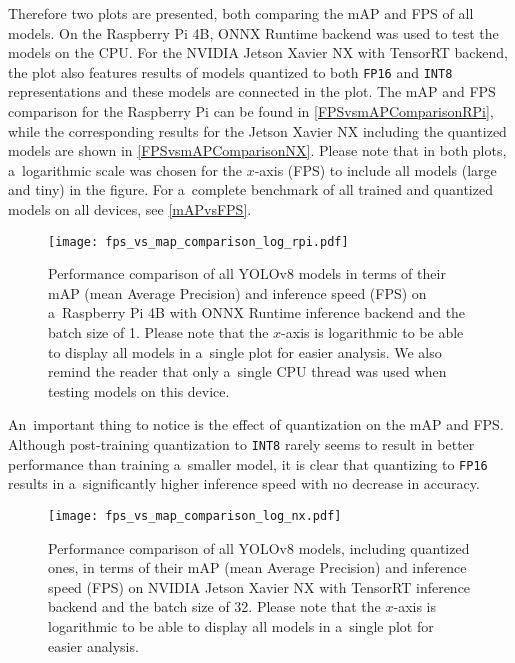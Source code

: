 Therefore two plots are presented, both comparing the mAP and FPS of all models.
On the Raspberry Pi 4B, ONNX Runtime backend was used to test the models on the
CPU. For the NVIDIA Jetson Xavier NX with TensorRT backend, the plot also
features results of models quantized to both \texttt{FP16} and \texttt{INT8}
representations and these models are connected in the plot. The mAP and FPS
comparison for the Raspberry Pi can be found in \autoref{FPSvsmAPComparisonRPi},
while the corresponding results for the Jetson Xavier NX including the quantized
models are shown in \autoref{FPSvsmAPComparisonNX}. Please note that in both
plots, a~logarithmic scale was chosen for the $x$-axis (FPS) to include all
models (large and tiny) in the figure. For a~complete benchmark of all trained
and quantized models on all devices, see \autoref{mAPvsFPS}.

\begin{figure}[t]
        \centering
        \texttt{[image: fps\_vs\_map\_comparison\_log\_rpi.pdf]}
        \caption{Performance comparison of all YOLOv8 models in terms of their
        mAP (mean Average Precision) and inference speed (FPS) on a~Raspberry Pi
        4B with ONNX Runtime inference backend and the batch size of 1. Please
        note that the $x$-axis is logarithmic to be able to display all models
        in a~single plot for easier analysis. We also remind the reader that
        only a~single CPU thread was used when testing models on this device.}
        \label{FPSvsmAPComparisonRPi}
\end{figure}

An~important thing to notice is the effect of quantization on the mAP and FPS.
Although post-training quantization to \texttt{INT8} rarely seems to result in
better performance than training a~smaller model, it is clear that quantizing to
\texttt{FP16} results in a~significantly higher inference speed with no decrease
in accuracy.

\begin{figure}[H]
        \centering
        \texttt{[image: fps\_vs\_map\_comparison\_log\_nx.pdf]}
        \caption{Performance comparison of all YOLOv8 models, including
        quantized ones, in terms of their mAP (mean Average Precision) and
        inference speed (FPS) on NVIDIA Jetson Xavier NX with TensorRT inference
        backend and the batch size of 32. Please note that the $x$-axis is
        logarithmic to be able to display all models in a~single plot for easier
        analysis.}
        \label{FPSvsmAPComparisonNX}
\end{figure}

